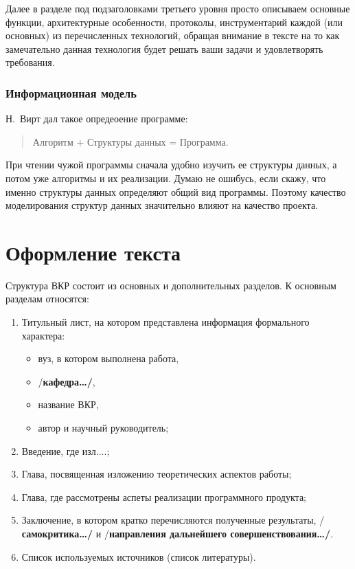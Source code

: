 \documentclass[a4paper,14pt,final]{extreport}
\newcommand{\aaa}[1]{{/\bfseries #1\ldots/}}
\begin{document}
Далее в разделе под подзаголовками третьего уровня просто описываем основные функции, архитектурные особенности, протоколы, инструментарий каждой (или основных) из перечисленных технологий, обращая внимание в тексте на то как замечательно данная технология будет решать ваши задачи и удовлетворять требования.

\subsection{Информационная модель}
\label{sec:infomod}

Н.~Вирт дал такое опредеоение программе:
\begin{quote}
  Алгоритм + Структуры данных = Программа.
\end{quote}
При чтении чужой программы сначала удобно изучить ее структуры данных, а потом уже алгоритмы и их реализации.  Думаю не ошибусь, если скажу, что именно структуры данных определяют общий вид программы.  Поэтому качество моделирования структур данных значительно влияют на качество проекта.

\chapter{Оформление текста}
\label{cha:layout}

Структура ВКР состоит из основных и дополнительных разделов.  К основным разделам относятся:
\begin{enumerate}
\item Титульный лист, на котором представлена информация формального характера:
  \begin{itemize}
  \item вуз, в котором выполнена работа,
  \item \aaa{кафедра},
  \item название ВКР,
  \item автор и научный руководитель;
  \end{itemize}
\item Введение, где изл....;
\item Глава, посвященная изложению теоретических аспектов работы;
\item Глава, где рассмотрены аспеты реализации программного продукта;
\item Заключение, в котором кратко перечисляются полученные результаты, \aaa{самокритика} и \aaa{направления дальнейшего совершенствования}.
\item Список используемых источников (список литературы).
\end{enumerate}
\end{document}
